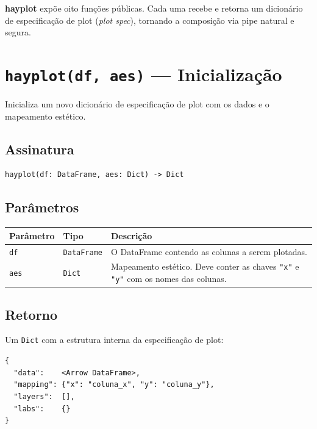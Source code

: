 \documentclass[12pt, a4paper, oneside]{book}
\newcommand{\code}[1]{\texttt{#1}}
\newcommand{\hayplot}{\textbf{hayplot}}
\begin{document}
\hayplot{} expõe oito funções públicas. Cada uma recebe e retorna um
dicionário de especificação de plot (\textit{plot spec}), tornando a
composição via pipe natural e segura.

\section{\texttt{hayplot(df, aes)} --- Inicialização}

Inicializa um novo dicionário de especificação de plot com os dados e o
mapeamento estético.

\subsection*{Assinatura}

\begin{lstlisting}[style=inline]
hayplot(df: DataFrame, aes: Dict) -> Dict
\end{lstlisting}

\subsection*{Parâmetros}

\begin{tabularx}{\textwidth}{@{}lL{2.5cm}X@{}}
  \toprule
  \textbf{Parâmetro} & \textbf{Tipo} & \textbf{Descrição} \\
  \midrule
  \code{df}  & \code{DataFrame} & O DataFrame contendo as colunas a serem plotadas. \\[4pt]
  \code{aes} & \code{Dict}      & Mapeamento estético. Deve conter as chaves
                                  \code{"x"} e \code{"y"} com os nomes das colunas. \\
  \bottomrule
\end{tabularx}

\subsection*{Retorno}

Um \code{Dict} com a estrutura interna da especificação de plot:

\begin{lstlisting}[style=inline]
{
  "data":    <Arrow DataFrame>,
  "mapping": {"x": "coluna_x", "y": "coluna_y"},
  "layers":  [],
  "labs":    {}
}
\end{lstlisting}
\end{document}
